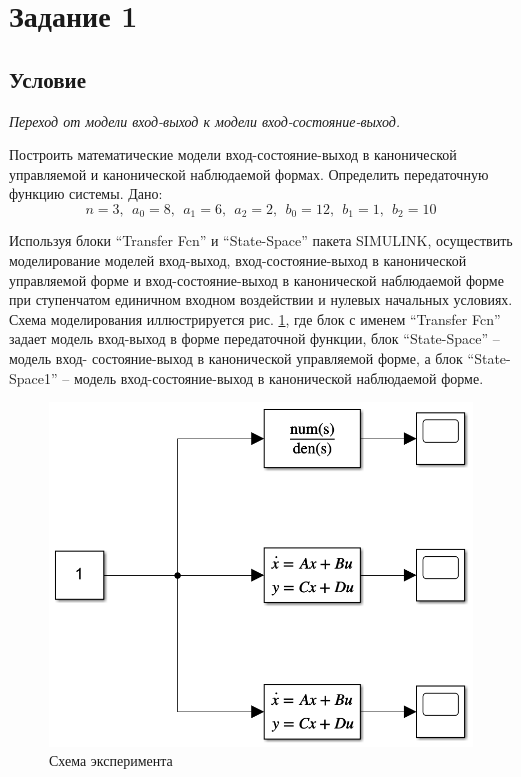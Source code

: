\documentclass[a4paper, 12pt]{article}
\begin{document}
    \section{Задание 1}
    \subsection{Условие}
    \textit{Переход от модели вход-выход к модели вход-состояние-выход.}
    \begin{compactitem}
        \item Построить математические модели вход-состояние-выход
        в канонической управляемой и канонической
        наблюдаемой формах. Определить передаточную функцию системы. Дано:
        $$n=3,\ \ a_0=8,\ \ a_1=6,\ \ a_2=2,\ \ b_0=12,\ \ b_1=1,\ \ b_2=10$$
        \item Используя блоки ``Transfer Fcn'' и ``State-Space'' пакета SIMULINK,
        осуществить моделирование моделей вход-выход, вход-состояние-выход в канонической
        управляемой форме и вход-состояние-выход в канонической наблюдаемой форме при
        ступенчатом единичном входном воздействии и нулевых начальных условиях. Схема
        моделирования иллюстрируется рис. \ref{fig:scheme1}, где блок с именем ``Transfer Fcn'' задает модель
        вход-выход в форме передаточной функции, блок ``State-Space'' -- модель вход-
        состояние-выход в канонической управляемой форме, а блок ``State-Space1'' -- модель
        вход-состояние-выход в канонической наблюдаемой форме.
        \begin{figure}[H]
            \centering
            \includegraphics[scale=0.5]{scheme1.png}
            \captionsetup{skip=0pt}
            \caption{Схема эксперимента}
            \label{fig:scheme1}
        \end{figure}
    \end{compactitem}
    
\end{document}
